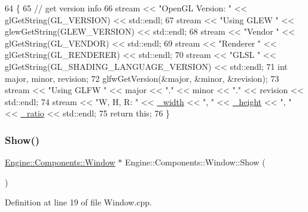 \begin{DoxyCode}
64 \{
65     \textcolor{comment}{// get version info}
66     stream << \textcolor{stringliteral}{"OpenGL Version: "} << glGetString(GL\_VERSION) << std::endl;
67     stream << \textcolor{stringliteral}{"Using GLEW "} << glewGetString(GLEW\_VERSION) << std::endl;
68     stream << \textcolor{stringliteral}{"Vendor "} << glGetString(GL\_VENDOR) << std::endl;
69     stream << \textcolor{stringliteral}{"Renderer "} << glGetString(GL\_RENDERER) << std::endl;
70     stream << \textcolor{stringliteral}{"GLSL "} << glGetString(GL\_SHADING\_LANGUAGE\_VERSION) << std::endl;
71     \textcolor{keywordtype}{int} major, minor, revision;
72     glfwGetVersion(&major, &minor, &revision);
73     stream << \textcolor{stringliteral}{"Using GLFW "} << major << \textcolor{stringliteral}{"."} << minor << \textcolor{stringliteral}{"."} << revision << std::endl;
74     stream << \textcolor{stringliteral}{"W, H, R: "} << \mbox{\hyperlink{classEngine_1_1Components_1_1Window_a65e35d20618664aac50bc7036896b524}{\_width}} << \textcolor{stringliteral}{", "} << \mbox{\hyperlink{classEngine_1_1Components_1_1Window_a0a50127d5427b543f83d88bb03a99c1e}{\_height}} << \textcolor{stringliteral}{", "} << 
      \mbox{\hyperlink{classEngine_1_1Components_1_1Window_a785d2029ba6e6b10c7adab8513ec88b3}{\_ratio}} << std::endl;
75     \textcolor{keywordflow}{return} \textcolor{keyword}{this};
76 \}
\end{DoxyCode}
\mbox{\label{classEngine_1_1Components_1_1Window_adddcf28e753f81571ba39b4d8f698ada}} 
\subsubsection{\texorpdfstring{Show()}{Show()}}
{\footnotesize\ttfamily \mbox{\hyperlink{classEngine_1_1Components_1_1Window}{Engine\+::\+Components\+::\+Window}} $\ast$ Engine\+::\+Components\+::\+Window\+::\+Show (\begin{DoxyParamCaption}{ }\end{DoxyParamCaption})}



Definition at line 19 of file Window.\+cpp.



